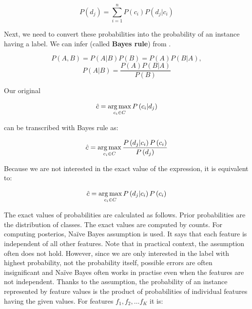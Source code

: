 \begin{equation}
	P\left(d_j\right) = \sum_{i=1}^{n}{
	P\left(c_i\right)
	P\left(d_j|c_i\right)
}
\end{equation}

Next, we need to convert these probabilities into the probability of an instance having a label.
We can infer  (called \textbf{Bayes rule}) from .

\begin{equation}
	\label{eq:bayesinfer}
	P\left(A,B\right) = 
	P\left(A|B\right)
	P\left(B\right) = 
	P\left(A\right)
	P\left(B|A\right),
\end{equation}
\begin{equation}
	\label{eq:bayesrule}
	P\left(A|B\right) =
	\frac{
	P\left(A\right)
P\left(B|A\right)}
{P\left(B\right)}
\end{equation}

Our original 

\begin{equation}
	\hat{c} = \operatorname*{arg\,max}_{c_i \in C} P\left(c_i  | d_j \right)
\end{equation}

can be transcribed with Bayes rule as:

\begin{equation}
	\hat{c} = \operatorname*{arg\,max}_{c_i \in C}
	\frac{
	P\left(d_j  | c_i \right)
	P\left( c_i \right)
}{
	P\left( d_j \right)
}
\end{equation}

Because we are not interested in the exact value of the expression, it is equivalent to:

\begin{equation}
	\label{eq:classprb}
	\hat{c} = \operatorname*{arg\,max}_{c_i \in C}
	P\left(d_j  | c_i \right)
	P\left( c_i \right)
\end{equation}

The exact values of probabilities are calculated as follows.
Prior probabilities are the distribution of classes.
The exact values are computed by counts.
For computing posterios, Na\"{i}ve Bayes assumption is used.
It says that each feature is independent of all other features.
Note that in practical context, the assumption often does not hold.
However, since we are only interested in the label with highest probability,
not the probability itself, possible errors are often insignificant and Na\"{i}ve Bayes often works in practise even when the features are not independent.
Thanks to the assumption, the probability of an instance represented by feature values is the product
of probabilities of individual features having the given values.
For features $f_1, f_2, \dots f_K$ it is:


